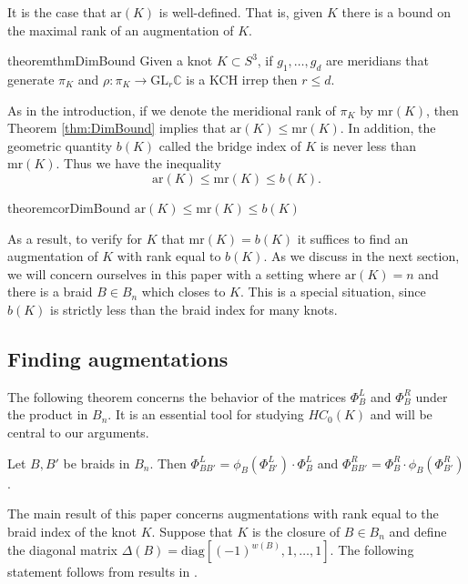 \documentclass[11pt]{amsart}
\def\C{{\mathbb C}}
\begin{document}
  It is the case that $\text{ar}(K)$ is well-defined. That is, given $K$ there is a bound on the maximal rank of an augmentation of $K$.

  \begin{restatable}{theorem}{thmDimBound} Given a knot $K\subset S^3$, if $g_1,\ldots,g_d$ are meridians that generate $\pi_K$ and $\rho:\pi_K\to\text{GL}_r\C$ is a KCH irrep then $r\le d$.
  \label{thm:DimBound}
  \end{restatable}

  As in the introduction, if we denote the meridional rank of $\pi_K$ by $\text{mr}(K)$, then Theorem \ref{thm:DimBound} implies that $\text{ar}(K)\le\text{mr}(K)$. In addition, the geometric quantity $b(K)$ called the bridge index of $K$ is never less than $\text{mr}(K)$. Thus we have the inequality 
    \[\text{ar}(K)\le\text{mr}(K)\le b(K).\]
    
\begin{restatable}{theorem}{corDimBound}
\label{cor:DimBound}
$\text{ar}(K)\le\text{mr}(K)\le b(K)$
\end{restatable}    
    
  As a result, to verify for $K$ that $\text{mr}(K)=b(K)$ it suffices to find an augmentation of $K$ with rank equal to $b(K)$. As we discuss in the next section, we will concern ourselves in this paper with a setting where $\text{ar}(K)=n$ and there is a braid $B\in B_n$ which closes to $K$. This is a special situation, since $b(K)$ is strictly less than the braid index for many knots.

\subsection{Finding augmentations}
\label{SecBG_AugExist}
  The following theorem concerns the behavior of the matrices $\Phi_B^L$ and $\Phi_B^R$ under the product in $B_n$. It is an essential tool for studying $HC_0(K)$ and will be central to our arguments.

  \begin{thm} Let $B,B'$ be braids in $B_n$. Then $\Phi_{BB'}^L = \phi_B(\Phi_{B'}^L)\cdot\Phi_B^L$ and $\Phi_{BB'}^R = \Phi_B^R\cdot\phi_B(\Phi_{B'}^R)$.
  \label{thm:ChainRule}
  \end{thm}

  The main result of this paper concerns augmentations with rank equal to the braid index of the knot $K$. Suppose that $K$ is the closure of $B\in B_n$ and define the diagonal matrix $\Delta(B)=\text{diag}[(-1)^{w(B)},1,\ldots,1]$. The following statement follows from results in \cite[Section 5]{Cor13b}.
\end{document}
